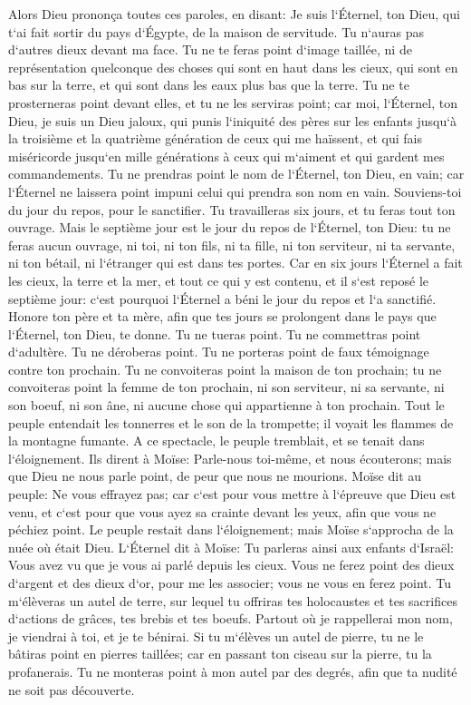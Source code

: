 \verse Alors Dieu prononça toutes ces paroles, en disant: 
\verse Je suis l`Éternel, ton Dieu, qui t`ai fait sortir du pays d`Égypte, de la maison de servitude. 
\verse Tu n`auras pas d`autres dieux devant ma face. 
\verse Tu ne te feras point d`image taillée, ni de représentation quelconque des choses qui sont en haut dans les cieux, qui sont en bas sur la terre, et qui sont dans les eaux plus bas que la terre. 
\verse Tu ne te prosterneras point devant elles, et tu ne les serviras point; car moi, l`Éternel, ton Dieu, je suis un Dieu jaloux, qui punis l`iniquité des pères sur les enfants jusqu`à la troisième et la quatrième génération de ceux qui me haïssent, 
\verse et qui fais miséricorde jusqu`en mille générations à ceux qui m`aiment et qui gardent mes commandements. 
\verse Tu ne prendras point le nom de l`Éternel, ton Dieu, en vain; car l`Éternel ne laissera point impuni celui qui prendra son nom en vain. 
\verse Souviens-toi du jour du repos, pour le sanctifier. 
\verse Tu travailleras six jours, et tu feras tout ton ouvrage. 
\verse Mais le septième jour est le jour du repos de l`Éternel, ton Dieu: tu ne feras aucun ouvrage, ni toi, ni ton fils, ni ta fille, ni ton serviteur, ni ta servante, ni ton bétail, ni l`étranger qui est dans tes portes. 
\verse Car en six jours l`Éternel a fait les cieux, la terre et la mer, et tout ce qui y est contenu, et il s`est reposé le septième jour: c`est pourquoi l`Éternel a béni le jour du repos et l`a sanctifié. 
\verse Honore ton père et ta mère, afin que tes jours se prolongent dans le pays que l`Éternel, ton Dieu, te donne. 
\verse Tu ne tueras point. 
\verse Tu ne commettras point d`adultère. 
\verse Tu ne déroberas point. 
\verse Tu ne porteras point de faux témoignage contre ton prochain. 
\verse Tu ne convoiteras point la maison de ton prochain; tu ne convoiteras point la femme de ton prochain, ni son serviteur, ni sa servante, ni son boeuf, ni son âne, ni aucune chose qui appartienne à ton prochain. 
\verse Tout le peuple entendait les tonnerres et le son de la trompette; il voyait les flammes de la montagne fumante. A ce spectacle, le peuple tremblait, et se tenait dans l`éloignement. 
\verse Ils dirent à Moïse: Parle-nous toi-même, et nous écouterons; mais que Dieu ne nous parle point, de peur que nous ne mourions. 
\verse Moïse dit au peuple: Ne vous effrayez pas; car c`est pour vous mettre à l`épreuve que Dieu est venu, et c`est pour que vous ayez sa crainte devant les yeux, afin que vous ne péchiez point. 
\verse Le peuple restait dans l`éloignement; mais Moïse s`approcha de la nuée où était Dieu. 
\verse L`Éternel dit à Moïse: Tu parleras ainsi aux enfants d`Israël: Vous avez vu que je vous ai parlé depuis les cieux. 
\verse Vous ne ferez point des dieux d`argent et des dieux d`or, pour me les associer; vous ne vous en ferez point. 
\verse Tu m`élèveras un autel de terre, sur lequel tu offriras tes holocaustes et tes sacrifices d`actions de grâces, tes brebis et tes boeufs. Partout où je rappellerai mon nom, je viendrai à toi, et je te bénirai. 
\verse Si tu m`élèves un autel de pierre, tu ne le bâtiras point en pierres taillées; car en passant ton ciseau sur la pierre, tu la profanerais. 
\verse Tu ne monteras point à mon autel par des degrés, afin que ta nudité ne soit pas découverte. 

